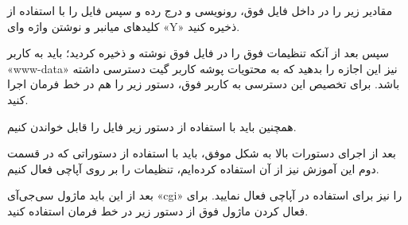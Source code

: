 \begin{latin}  
    
\end{latin}

مقادیر زیر را در داخل فایل فوق، رونویسی و درج رده و سپس فایل را با استفاده از کلیدهای میانبر 
 و نوشتن واژه وای «Y» ذخیره کنید.
\newline

\begin{latin}  
    
\end{latin}

سپس بعد از آنکه تنظیمات فوق را در فایل فوق نوشته و ذخیره کردید؛ باید به کاربر «www-data» نیز این اجازه را بدهید که به محتویات پوشه کاربر گیت 
 دسترسی داشته باشد.  برای تخصیص این دسترسی به کاربر فوق، دستور زیر را هم در خط فرمان اجرا کنید.
\newline

\begin{latin}  
    
\end{latin}
همچنین باید با استفاده از دستور زیر فایل
 را قابل خواندن کنیم.
\newline

\begin{latin}  
    
\end{latin}

بعد از اجرای دستورات بالا به شکل موفق، باید با استفاده از دستوراتی که در قسمت دوم این آموزش نیز از آن استفاده کرده‌ایم، تنظیمات را بر روی آپاچی فعال کنیم.
\newline

\begin{latin}  
    
\end{latin}

بعد از این باید ماژول سی‌جی‌آی «cgi» را نیز برای استفاده در آپاچی فعال نمایید. برای فعال کردن ماژول فوق از دستور زیر در خط فرمان استفاده کنید.
\newline

